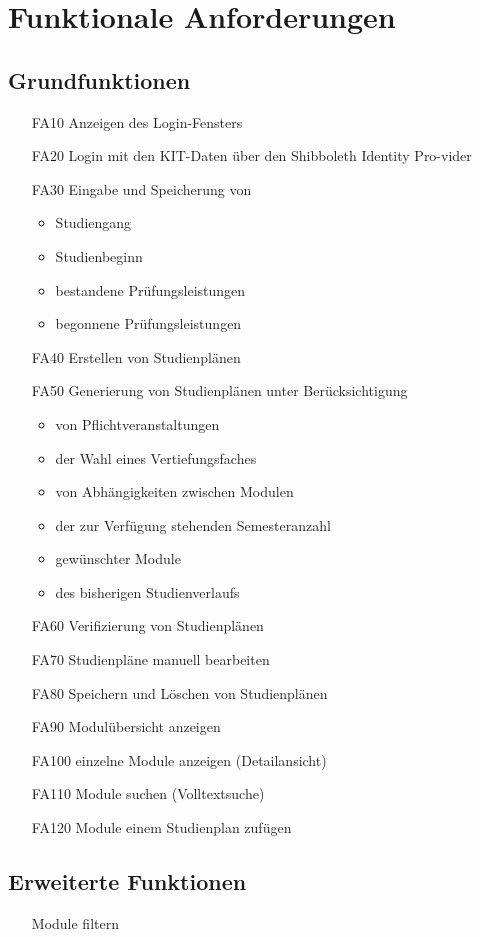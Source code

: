 \section{Funktionale Anforderungen}

	\subsection{Grundfunktionen}
	\begin{itemize}[nosep]	
		\item [FA10] Anzeigen des Login-Fensters
		\item[FA20] Login mit den KIT-Daten über den Shibboleth Identity Pro-vider
		\item [FA30]Eingabe und Speicherung von
		\begin{itemize}[nosep]
			\item Studiengang
			\item Studienbeginn
			\item bestandene Prüfungsleistungen
			\item begonnene Prüfungsleistungen
		\end{itemize}
		\item [FA40] Erstellen von Studienplänen
		\item [FA50] Generierung von Studienplänen unter Berücksichtigung
			\begin{itemize}[nosep]
			\item von Pflichtveranstaltungen
			\item der Wahl eines Vertiefungsfaches
			\item von Abhängigkeiten zwischen Modulen
			\item der zur Verfügung stehenden Semesteranzahl
			\item gewünschter Module
			\item des bisherigen Studienverlaufs
			\end{itemize}
		\item [FA60] Verifizierung von Studienplänen
		\item [FA70] Studienpläne manuell bearbeiten
		\item [FA80]Speichern und Löschen von Studienplänen
		\item[FA90] Modulübersicht anzeigen 
		\item[FA100] einzelne Module anzeigen (Detailansicht)
		\item[FA110] Module suchen (Volltextsuche)
		\item[FA120] Module einem Studienplan zufügen
		\end{itemize}
	\subsection{Erweiterte Funktionen}
		\begin{itemize}[nosep]
		\item [] Module filtern
		\end{itemize}

